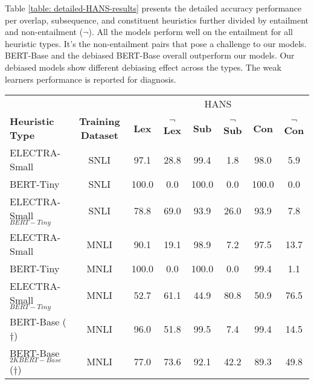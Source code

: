 \documentclass[11pt,a4paper]{article}
\begin{document}
Table \ref{table: detailed-HANS-results} presents the detailed accuracy performance per overlap, subsequence, and constituent heuristics further divided by entailment and non-entailment ($\neg$). All the models perform well on the entailment for all heuristic types. It's the non-entailment pairs that pose a challenge to our models. BERT-Base and the debiased BERT-Base overall outperform our models. Our debiased models show different debiasing effect across the types. The weak learners performance is reported for diagnosis. 
\begin{table*}[th]
\begin{center}
\begin{tabular}{lccccccc}
\hline 
& & \multicolumn{6}{c}{HANS}
\\
\textbf{Heuristic Type} & \textbf{Training Dataset} & \textbf{Lex}& $\neg$ \textbf{Lex} & \textbf{Sub} & $\neg$ \textbf{Sub} &\textbf{Con} & $\neg$ \textbf{Con} \\ \hline
ELECTRA-Small &  SNLI & 97.1 & 28.8 & 99.4 & 1.8 & 98.0 & 5.9  \\
BERT-Tiny &  SNLI & 100.0 & 0.0 & 100.0 & 0.0 & 100.0 & 0.0  \\
ELECTRA-Small$_{BERT-Tiny}$ &  SNLI & 78.8 & 69.0 & 93.9 & 26.0 & 93.9 & 7.8  \\
ELECTRA-Small &  MNLI & 90.1 & 19.1 & 98.9 & 7.2 & 97.5 & 13.7  \\
BERT-Tiny &  MNLI & 100.0 & 0.0 & 100.0 & 0.0 & 99.4 & 1.1  \\
ELECTRA-Small$_{BERT-Tiny}$ &  MNLI & 52.7 & 61.1 & 44.9 & 80.8 & 50.9 & 76.5  \\
BERT-Base ($\dagger$) &  MNLI & 96.0 & 51.8 & 99.5 & 7.4 & 99.4 & 14.5  \\
BERT-Base$_{2K BERT-Base}$ ($\dagger$) &  MNLI & 77.0 & 73.6 & 92.1 & 42.2 & 89.3 & 49.8 \\
\hline
\end{tabular}
\end{center}
\caption{Detailed Accuracy Performance of Best Performing Models on SNLI and MNLI Datasets and Their Equivalent Baseline. Performance metrics for BERT-Base ($\dagger$) are cited from \citet{utama2020debiasing}.}
\label{table: detailed-HANS-results}
\end{table*}
\end{document}
